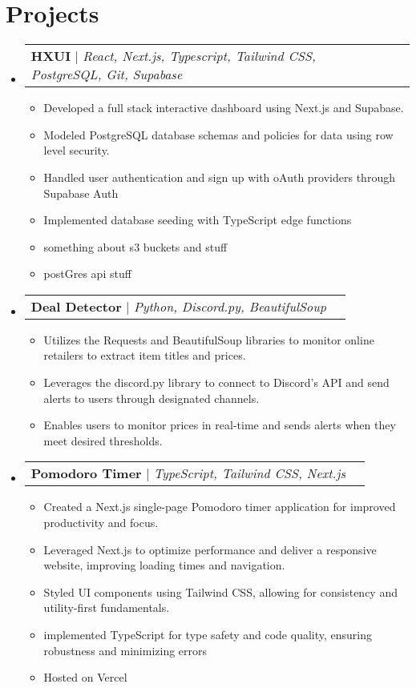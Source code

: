 \documentclass[letterpaper,11pt]{article}
\makeatletter
\newcommand{\resumeItem}[1]{
  \item\small{
    {#1 \vspace{-2pt}}
  }
}
\newcommand{\resumeProjectHeading}[2]{
    \item
    \begin{tabular*}{0.97\textwidth}{l@{\extracolsep{\fill}}r}
      \small#1 & #2 \\
    \end{tabular*}\vspace{-7pt}
}
\newcommand{\resumeSubHeadingListStart}{\begin{itemize}[leftmargin=0.15in, label={}]}
\newcommand{\resumeSubHeadingListEnd}{\end{itemize}}
\newcommand{\resumeItemListStart}{\begin{itemize}}
\newcommand{\resumeItemListEnd}{\end{itemize}\vspace{-5pt}}
\makeatother
\begin{document}
\section{Projects}
    \resumeSubHeadingListStart
      \resumeProjectHeading
          {\textbf{HXUI} $|$ \emph{React, Next.js, Typescript, Tailwind CSS, PostgreSQL, Git, Supabase}}{}
          \resumeItemListStart
            \resumeItem{Developed a full stack interactive dashboard using Next.js and Supabase. }
            \resumeItem{Modeled PostgreSQL database schemas and policies for data using row level security. }
            \resumeItem{Handled user authentication and sign up with oAuth providers through Supabase Auth}
            \resumeItem{Implemented database seeding with TypeScript edge functions}
            \resumeItem{something about s3 buckets and stuff}
            \resumeItem{postGres api stuff}
          \resumeItemListEnd
                \resumeProjectHeading
          {\textbf{Deal Detector} $|$ \emph{Python, Discord.py, BeautifulSoup}}{}
          \resumeItemListStart
            \resumeItem{Utilizes the Requests and BeautifulSoup libraries to monitor online retailers to extract item titles and prices.}
            \resumeItem{Leverages the discord.py library to connect to Discord's API and send alerts to users through designated channels.}
            \resumeItem{Enables users to monitor prices in real-time and sends alerts when they meet desired thresholds.}
          \resumeItemListEnd
      \resumeProjectHeading
          {\textbf{Pomodoro Timer} $|$ \emph{TypeScript, Tailwind CSS, Next.js}}{}
          \resumeItemListStart
            \resumeItem{Created a Next.js single-page Pomodoro timer application for improved productivity and focus.}
            \resumeItem{Leveraged Next.js to optimize performance and deliver a responsive website, improving loading times and navigation.}
            \resumeItem{Styled UI components using Tailwind CSS, allowing for consistency and utility-first fundamentals.}
            \resumeItem{implemented TypeScript for type safety and code quality, ensuring robustness and minimizing errors}
            \resumeItem{Hosted on Vercel }
          \resumeItemListEnd
    \resumeSubHeadingListEnd



%
\end{document}

